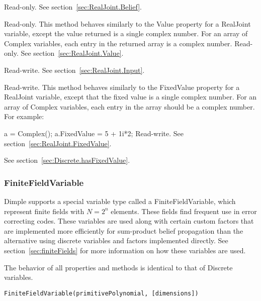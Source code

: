 

Read-only.  See section~\ref{sec:RealJoint.Belief}.


\ifmatlab
Read-only.  This method behaves similarly to the Value property for a RealJoint variable, except the value returned is a single complex number.  For an array of Complex variables, each entry in the returned array is a complex number.
\fi
\ifjava
Read-only.  See section~\ref{sec:RealJoint.Value}.
\fi


Read-write.  See section~\ref{sec:RealJoint.Input}.


\ifmatlab
Read-write.  This method behaves similarly to the FixedValue property for a RealJoint variable, except that the fixed value is a single complex number.  For an array of Complex variables, each entry in the array should be a complex number.  For example:

a = Complex();
a.FixedValue = 5 + 1i*2;
\fi
\ifjava
Read-write.  See section~\ref{sec:RealJoint.FixedValue}.
\fi



See section~\ref{sec:Discrete.hasFixedValue}.


\subsubsection{FiniteFieldVariable}

Dimple supports a special variable type called a FiniteFieldVariable, which represent finite fields with $N=2^{n}$ elements. These fields find frequent use in error correcting codes.  These variables are used along with certain custom factors that are implemented more efficiently for sum-product belief propagation than the alternative using discrete variables and factors implemented directly.  See section~\ref{sec:finiteFields} for more information on how these variables are used.

The behavior of all properties and methods is identical to that of Discrete variables.


\ifmatlab
\begin{lstlisting}
FiniteFieldVariable(primitivePolynomial, [dimensions])
\end{lstlisting}
\fi

